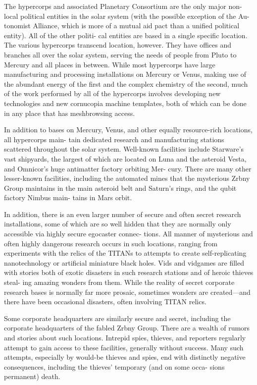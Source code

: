 The hypercorps and associated Planetary Consortium 
are the only major non-local political entities in the 
solar system (with the possible exception of the Au-
tonomist Alliance, which is more of a mutual aid pact 
than a unified political entity). All of the other politi-
cal entities are based in a single specific location. The 
various hypercorps transcend location, however. They 
have offices and branches all over the solar system, 
serving the needs of people from Pluto to Mercury 
and all places in between. While most hypercorps 
have large manufacturing and processing installations 
on Mercury or Venus, making use of the abundant 
energy of the first and the complex chemistry of the 
second, much of the work performed by all of the 
hypercorps involves developing new technologies and 
new cornucopia machine templates, both of which can 
be done in any place that has meshbrowsing access.

In addition to bases on Mercury, Venus, and other 
equally resource-rich locations, all hypercorps main-
tain dedicated research and manufacturing stations 
scattered throughout the solar system. Well-known 
facilities include Starware's vast shipyards, the largest 
of which are located on Luna and the asteroid Vesta, 
and Omnicor's huge antimatter factory orbiting Mer-
cury. There are many other lesser-known facilities, 
including the automated mines that the mysterious 
Zrbny Group maintains in the main asteroid belt and 
Saturn's rings, and the qubit factory Nimbus main-
tains in Mars orbit.

In addition, there is an even larger number of 
secure and often secret research installations, some 
of which are so well hidden that they are normally 
only accessible via highly secure egocaster connec-
tions. All manner of mysterious and often highly 
dangerous research occurs in such locations, ranging 
from experiments with the relics of the TITANs to 
attempts to create self-replicating nanotechnology or 
artificial miniature black holes. Vids and vidgames 
are filled with stories both of exotic disasters in 
such research stations and of heroic thieves steal-
ing amazing wonders from them. While the reality 
of secret corporate research bases is normally far 
more prosaic, sometimes wonders are created—and 
there have been occasional disasters, often involving 
TITAN relics.

Some corporate headquarters are similarly secure 
and secret, including the corporate headquarters 
of the fabled Zrbny Group. There are a wealth of 
rumors and stories about such locations. Intrepid 
spies, thieves, and reporters regularly attempt to gain 
access to these facilities, generally without success. 
Many such attempts, especially by would-be thieves 
and spies, end with distinctly negative consequences, 
including the thieves' temporary (and on some occa-
sions permanent) death.

